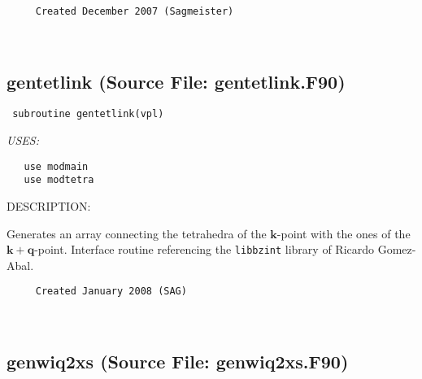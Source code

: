 \documentclass[11pt]{article}
\begin{document}
\begin{verbatim}     Created December 2007 (Sagmeister)\end{verbatim}






 
 
\mbox{}\hrulefill\ 
 
\subsection{gentetlink (Source File: gentetlink.F90)}


\begin{verbatim} subroutine gentetlink(vpl)\end{verbatim}{\em USES:}
\begin{verbatim}   use modmain
   use modtetra\end{verbatim}
{\sf DESCRIPTION:\\ }


     Generates an array connecting the tetrahedra of the $\mathbf{k}$-point with
     the ones of the  $\mathbf{k}+\mathbf{q}$-point. Interface routine
     referencing the {\tt libbzint} library of Ricardo Gomez-Abal.
  
\begin{verbatim}     Created January 2008 (SAG)\end{verbatim}






 
 
\mbox{}\hrulefill\ 
 
\subsection{genwiq2xs (Source File: genwiq2xs.F90)}
\end{document}
